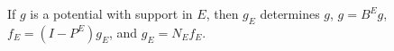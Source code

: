 If $g$ is a potential with support in $E$, then $g_E$ determines $g$, $g = B^E g$, $f_E = (I - P^E)g_E$, and $g_E = N_E f_E$.
